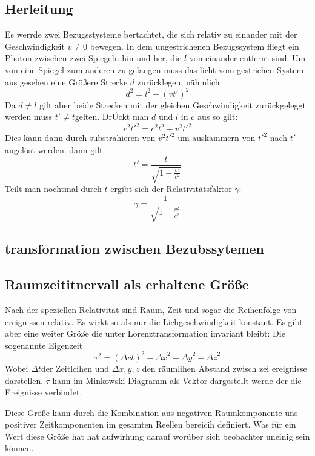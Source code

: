 \documentclass[12pt]{article}
\begin{document}
\subsection{Herleitung}
Es werrde zwei Bezugsstysteme bertachtet, die sich relativ zu einander mit der Geschwindigkeit $v \neq 0$ bewegen.
In dem ungestrichenen Bezugssystem fliegt ein Photon zwischen zwei Spiegeln hin und her, die $l$ von einander entfernt sind.
Um von eine Spiegel zum anderen zu gelangen muss das licht vom gestrichen System aus gesehen eine Größere Strecke $d$ zurücklegen, nähmlich:
\begin{equation}
d^2 = l^2 + (vt')^2
\end{equation}
Da $d \neq l$ gilt aber beide Strecken mit der gleichen Geschwindigkeit zurückgeleggt werden muss $t' \neq t$gelten.
DrÚckt man $d$ und $l$ in $c$ aus so gilt:
\begin{equation}
c^2t'^2 = c^2t^2 + v^2t'^2
\end{equation}
Dies kann dann durch substrahieren von $v^2t'^2$ um auskammern von $t'^2$ nach $t'$ augelöst werden.
dann gilt:
\begin{equation}
t' = \frac{t}{\sqrt{1-\frac{v^2}{c^2}}}
\end{equation}
Teilt man nochtmal durch $t$ ergibt sich der Relativitätsfaktor $\gamma$:
\begin{equation}
\gamma = \frac{1}{\sqrt{1-\frac{v^2}{c^2}}}
\end{equation}
\subsection{transformation zwischen Bezubssytemen}
\subsection{Raumzeititnervall als erhaltene Größe}
Nach der speziellen Relativität sind Raum, Zeit und sogar die Reihenfolge von ereignissen relativ.
Es wirkt so als nur die Lichgeschwindigkeit konstant.
Es gibt aber eine weiter Größe die unter Lorenztransformation invariant bleibt:
Die sogenannte Eigenzeit
\begin{equation}
\tau^2 = (\Delta ct)^2 - {\Delta x}^2 - {\Delta y}^2 - {\Delta z}^2
\end{equation}
Wobei $\Delta t$der Zeitlcihen und $\Delta x, y, z$ den räumlihen Abstand zwisch zei ereignisse darstellen.
$\tau$ kann im Minkowski-Diagramm als Vektor dargestellt werde der die Ereignisse verbindet.

Diese Größe kann durch die Kombination aus negativen Raumkomponente uns positiver Zeitkomponenten im gesamten Reellen bereicih definiert.
Was für ein Wert diese Größe hat hat aufwirhung darauf worüber sich beobachter uneinig sein können.
\end{document}
